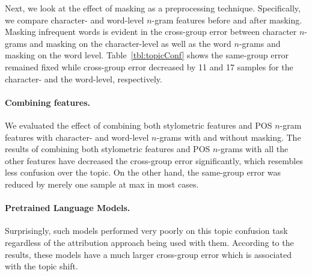 \documentclass[11pt]{article}
\begin{document}
Next, we look at the effect of masking as a preprocessing technique. Specifically, we compare character- and word-level $n$-gram features before and after masking. Masking infrequent words is evident in the cross-group error between character $n$-grams and masking on the character-level as well as the word $n$-grams and masking on the word level. Table~\ref{tbl:topicConf} shows the same-group error remained fixed while cross-group error decreased by 11 and 17 samples for the character- and the word-level, respectively. 


\paragraph{Combining features.}
We evaluated the effect of combining both stylometric features and POS $n$-gram features with character- and word-level $n$-grams with and without masking. The results of combining both stylometric features and POS $n$-grams with all the other features have decreased the cross-group error significantly, which resembles less confusion over the topic. On the other hand, the same-group error was reduced by merely one sample at max in most cases. 


\paragraph{Pretrained Language Models.} Surprisingly, such models performed very poorly on this topic confusion task regardless of the attribution approach being used with them. According to the results, these models have a much larger cross-group error which is associated with the topic shift. 
\end{document}
